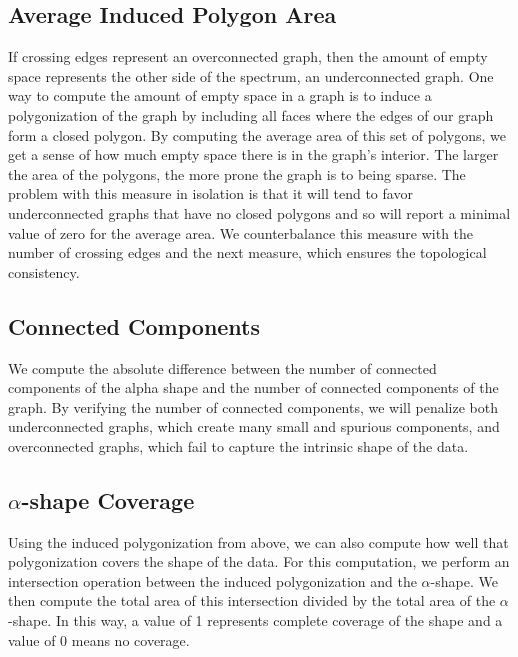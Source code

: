 \subsection{Average Induced Polygon Area}
%
If crossing edges represent an overconnected graph, then the amount of empty space represents the other side of the spectrum, an underconnected graph.
%
One way to compute the amount of empty space in a graph is to induce a polygonization of the graph by including all faces where the edges of our graph form a closed polygon.
%
By computing the average area of this set of polygons, we get a sense of how much empty space there is in the graph's interior.
%
The larger the area of the polygons, the more prone the graph is to being sparse.
%
The problem with this measure in isolation is that it will tend to favor underconnected graphs that have no closed polygons and so will report a minimal value of zero for the average area.
%
We counterbalance this measure with the number of crossing edges and the next measure, which ensures the topological consistency.

\subsection{Connected Components}
%
We compute the absolute difference between the number of connected components of the alpha shape and the number of connected components of the graph.
%
By verifying the number of connected components, we will penalize both underconnected graphs, which create many small and spurious components, and overconnected graphs, which fail to capture the intrinsic shape of the data.

\subsection{$\alpha$-shape Coverage}
%
Using the induced polygonization from above, we can also compute how well that polygonization covers the shape of the data.
%
For this computation, we perform an intersection operation between the induced polygonization and the $\alpha$-shape.
%
We then compute the total area of this intersection divided by the total area of the $\alpha$-shape.
%
In this way, a value of 1 represents complete coverage of the shape and a value of 0 means no coverage.

